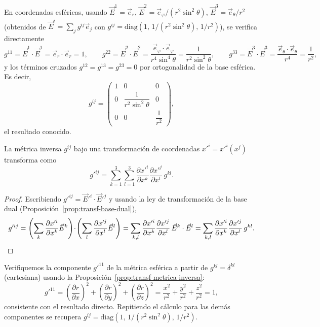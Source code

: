 \begin{ejemplo}
En coordenadas esféricas, usando $\vec E^1=\vec e_r$, $\vec E^2 = \vec
e_\varphi/(r^2\sin^2\theta)$, $\vec E^3 = \vec e_\theta/r^2$ (obtenidos de
$\vec E^i = \sum_j g^{ij}\vec e_j$ con $g^{ij}=\text{diag}(1,\,
1/(r^2\sin^2\theta),\,1/r^2)$), se verifica directamente
\[
g^{11} = \vec E^1\cdot\vec E^1 = \vec e_r\cdot\vec e_r = 1, \qquad
g^{22} = \vec E^2\cdot\vec E^2 = \frac{\vec e_\varphi\cdot\vec
e_\varphi}{r^4\sin^4\theta} = \frac{1}{r^2\sin^2\theta}, \qquad
g^{33} = \vec E^3\cdot\vec E^3 = \frac{\vec e_\theta\cdot\vec
e_\theta}{r^4} = \frac{1}{r^2},
\]
y los términos cruzados $g^{12}=g^{13}=g^{23}=0$ por ortogonalidad de la
base esférica. Es decir,
\[
g^{ij} = \begin{pmatrix} 1 & 0 & 0 \\ 0 & \dfrac{1}{r^2\sin^2\theta} & 0
\\ 0 & 0 & \dfrac{1}{r^2} \end{pmatrix},
\]
el resultado conocido.
\end{ejemplo}

\begin{proposicionc}
\label{prop:transf-metrica-inversa}
La métrica inversa $g^{ij}$ bajo una transformación de coordenadas
$x'^i=x'^i(x^j)$ transforma como
\[
g'^{ij} = \sum_{k=1}^{3}\sum_{l=1}^{3} \frac{\partial x'^i}{\partial
x^k}\frac{\partial x'^j}{\partial x^l}\, g^{kl} .
\]
\end{proposicionc}

\begin{proof}
Escribiendo $g'^{ij} = \vec E'^i\cdot\vec E'^j$ y usando la ley de
transformación de la base dual (Proposición~\ref{prop:transf-base-dual}),
\[
g'^{ij} = \left(\sum_k \frac{\partial x'^i}{\partial x^k}\vec
E^k\right)\!\cdot\!\left(\sum_l \frac{\partial x'^j}{\partial x^l}\vec
E^l\right) = \sum_{k,l} \frac{\partial x'^i}{\partial x^k}\frac{\partial
x'^j}{\partial x^l}\, \vec E^k\cdot\vec E^l = \sum_{k,l} \frac{\partial
x'^i}{\partial x^k}\frac{\partial x'^j}{\partial x^l}\, g^{kl} .
\qedhere
\]
\end{proof}

\begin{ejemplo}
Verifiquemos la componente $g'^{11}$ de la métrica esférica a partir de
$g^{kl}=\delta^{kl}$ (cartesiana) usando la
Proposición~\ref{prop:transf-metrica-inversa}:
\[
g'^{11} = \left(\frac{\partial r}{\partial x}\right)^2 +
\left(\frac{\partial r}{\partial y}\right)^2 + \left(\frac{\partial
r}{\partial z}\right)^2 = \frac{x^2}{r^2} + \frac{y^2}{r^2} +
\frac{z^2}{r^2} = 1 ,
\]
consistente con el resultado directo. Repitiendo el cálculo para las
demás componentes se recupera $g^{ij} =
\text{diag}(1,\,1/(r^2\sin^2\theta),\,1/r^2)$.
\end{ejemplo}

